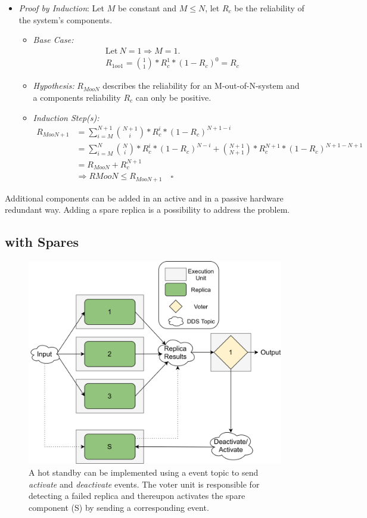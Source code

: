 \begin{itemize}
\item \emph{Proof by Induction}: Let $M$ be constant and $M \leq N$, let $R_{c}$ be the reliability of the system's components.
\begin{itemize}[label=$\lozenge$, itemsep=2ex]
\item \emph{Base Case:}
\begin{align*}
&\text{Let}~N = 1 \Rightarrow M = 1.\\
&R_{1oo1} = {1 \choose 1} * R_{c}^1 * (1 - R_{c})^0 = R_{c}
\end{align*}

\item \emph{Hypothesis:} $R_{MooN}$ describes the reliability for an M-out-of-N-system and a components reliability $R_{c}$ can only be positive.

\item \emph{Induction Step(s):}
\begin{align*}
R_{MooN+1} &= \sum_{i=M}^{N+1} {N + 1 \choose i} * R_{c}^i * (1 - R_c)^{N + 1 - i}\\
&= \sum_{i=M}^{N} {N \choose i} * R_{c}^i * (1 - R_c)^{N - i} + {N+1 \choose N+1} * R_c^{N+1} * (1 - R_c)^{N+1 - N+1}\\
&= R_{MooN} + R_c^{N+1} \\
&\Rightarrow R{MooN} \leq R_{MooN+1} \quad \square
\end{align*}
\end{itemize}
\end{itemize}

\noindent
Additional components can be added in an active and in a passive hardware redundant way.
Adding a spare replica is a possibility to address the \ChallengeWR problem.

\subsection{ with Spares}
\begin{figure}[!ht]
	\centering
	\includegraphics[width=0.8\linewidth]{images/TMRWithSparesDDS}
	\caption{A hot standby can be implemented using a  event topic to send \textit{activate} and \textit{deactivate} events. The voter unit is responsible for detecting a failed replica and thereupon activates the spare component (S) by sending a corresponding event.}
	\label{fig:TMRWithSparesDDS}
\end{figure}

